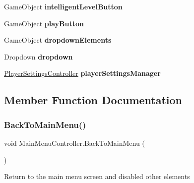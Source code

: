 \begin{DoxyCompactItemize}
Game\+Object {\bfseries intelligent\+Level\+Button}
\item 
\mbox{\label{class_main_menu_controller_ad34b5e84082701b51ff56153d0238cef}} 
Game\+Object {\bfseries play\+Button}
\item 
\mbox{\label{class_main_menu_controller_afd01bf4536b475b187535fce6d4455e3}} 
Game\+Object {\bfseries dropdown\+Elements}
\item 
\mbox{\label{class_main_menu_controller_a82d69a72488de677ed85fe376b84be06}} 
Dropdown {\bfseries dropdown}
\item 
\mbox{\label{class_main_menu_controller_a0d9638c2e2a55f6719c14116543e311f}} 
\mbox{\hyperlink{class_player_settings_controller}{Player\+Settings\+Controller}} {\bfseries player\+Settings\+Manager}
\end{DoxyCompactItemize}


\subsection{Member Function Documentation}
\mbox{\label{class_main_menu_controller_a5c5a50efe940a89139c09acf6e0c2526}} 
\subsubsection{\texorpdfstring{Back\+To\+Main\+Menu()}{BackToMainMenu()}}
{\footnotesize\ttfamily void Main\+Menu\+Controller.\+Back\+To\+Main\+Menu (\begin{DoxyParamCaption}{ }\end{DoxyParamCaption})}

Return to the main menu screen and disabled other elements \mbox{\label{class_main_menu_controller_ae525a96b1b6f2f3c39cf48fbe6e820bd}} 
